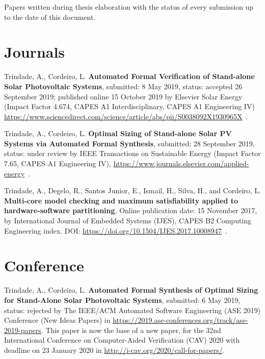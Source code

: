 %
Papers written during thesis elaboration with the status of every submission up to the date of this document.


\section{Journals}

Trindade, A., Cordeiro, L. \textbf{Automated Formal Verification of Stand-alone Solar Photovoltaic Systems}, submitted: 8 May 2019, status: accepted 26 September 2019; published online 15 October 2019 by Elsevier Solar Energy (Impact Factor 4.674, CAPES A1 Interdisciplinary, CAPES A1 Engineering IV) \url{https://www.sciencedirect.com/science/article/abs/pii/S0038092X1930965X}~\cite{TrindadeCordeiro19}.

Trindade, A., Cordeiro, L. \textbf{Optimal Sizing of Stand-alone Solar PV Systems via Automated Formal Synthesis}, submitted: 28 September 2019, status: under review by IEEE Transactions on Sustainable Energy (Impact Factor 7.65, CAPES A1 Engineering IV), \url{https://www.journals.elsevier.com/applied-energy}~\cite{abs-1909-13139}.

Trindade, A., Degelo, R., Santos Junior, E., Ismail, H., Silva, H., and Cordeiro, L. \textbf{Multi-core model checking and maximum satisfiability applied to hardware-software partitioning}, Online publication date: 15 November 2017, by International Journal of Embedded Systems (IJES), CAPES B2 Computing Engineering index. DOI:   \url {https://doi.org/10.1504/IJES.2017.10008947}~\cite{TrindadeDJISC17}.


\section{Conference}

Trindade, A., Cordeiro, L. \textbf{Automated Formal Synthesis of Optimal Sizing for Stand-Alone Solar Photovoltaic Systems}, submitted: 6 May 2019, status: rejected by The IEEE/ACM Automated Software Engineering (ASE 2019) Conference (New Ideas Papers) in \url{https://2019.ase-conferences.org/track/ase-2019-papers}. This paper is now the base of a new paper, for the 32nd International Conference on Computer-Aided Verification (CAV) 2020 with deadline on 23 January 2020 in \url{http://i-cav.org/2020/call-for-papers/}.

